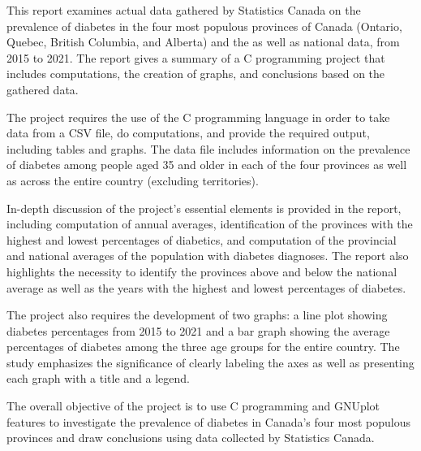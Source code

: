 {This report examines actual data gathered by Statistics Canada on the prevalence of diabetes in the four most populous provinces of Canada (Ontario, Quebec, British Columbia, and Alberta) and the as well as national data,  from 2015 to 2021. The report gives a summary of a C programming project that includes computations, the creation of graphs, and conclusions based on the gathered data.}

{The project requires the use of the C programming language in order to take data from a CSV file, do computations, and provide the required output, including tables and graphs. The data file includes information on the prevalence of diabetes among people aged 35 and older in each of the four provinces as well as across the entire country (excluding territories).}

{In-depth discussion of the project's essential elements is provided in the report, including computation of annual averages, identification of the provinces with the highest and lowest percentages of diabetics, and computation of the provincial and national averages of the population with diabetes diagnoses. The report also highlights the necessity to identify the provinces above and below the national average as well as the years with the highest and lowest percentages of diabetes.}

{The project also requires the development of two graphs: a line plot showing diabetes percentages from 2015 to 2021 and a bar graph showing the average percentages of diabetes among the three age groups for the entire country. The study emphasizes the significance of clearly labeling the axes as well as presenting each graph with a title and a legend.}

{The overall objective of the project is to use C programming and GNUplot features to investigate the prevalence of diabetes in Canada's four most populous provinces and draw conclusions using data collected by Statistics Canada.}

{}

